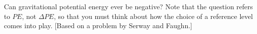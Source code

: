 Can gravitational potential energy ever be negative? Note
that the question refers to $PE$, not $\Delta PE$,
so that you must think about how the choice of a
reference level comes into play. [Based on a problem
by Serway and Faughn.]

